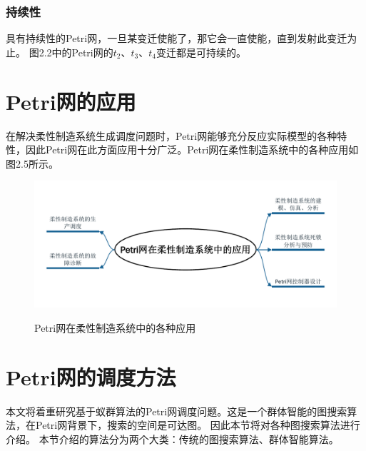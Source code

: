     \subsubsection{持续性}
    具有持续性的Petri网，一旦某变迁使能了，那它会一直使能，直到发射此变迁为止。
    图2.2中的Petri网的$t_2$、$t_3$、$t_4$变迁都是可持续的。
\section{Petri网的应用}
    在解决柔性制造系统生成调度问题时，Petri网能够充分反应实际模型的各种特性，因此Petri网在此方面应用十分广泛。Petri网在柔性制造系统中的各种应用如图2.5所示。
    \begin{figure}[H]
        \centering
        \includegraphics[scale=0.7,angle=0]{figures/figure2-5.pdf}\\
        \caption{Petri网在柔性制造系统中的各种应用}
    \end{figure}
\section{Petri网的调度方法}
    本文将着重研究基于蚁群算法的Petri网调度问题。这是一个群体智能的图搜索算法，在Petri网背景下，搜索的空间是可达图。
    因此本节将对各种图搜索算法进行介绍。
    本节介绍的算法分为两个大类：传统的图搜索算法、群体智能算法。
